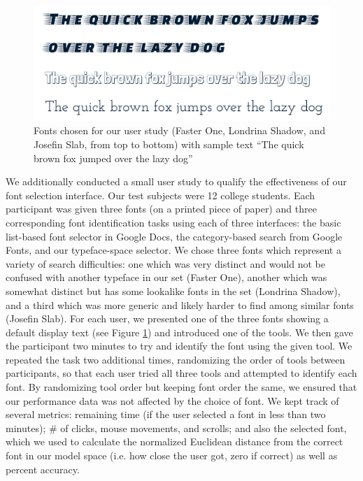 \begin{figure}[h]
    \centering
    \includegraphics[width=\textwidth]{images/user-fonts.pdf}
    \caption{Fonts chosen for our user study (Faster One, Londrina Shadow, and Josefin Slab, from top to bottom) with sample text ``The quick brown fox jumped over the lazy dog''}
    \label{fig:user-fonts}
\end{figure}

We additionally conducted a small user study to qualify the effectiveness of our font selection interface. Our test subjects were 12 college students. Each participant was given three fonts (on a printed piece of paper) and three corresponding font identification tasks using each of three interfaces: the basic list-based font selector in Google Docs, the category-based search from Google Fonts, and our typeface-space selector. We chose three fonts which represent a variety of search difficulties: one which was very distinct and would not be confused with another typeface in our set (Faster One), another which was somewhat distinct but has some lookalike fonts in the set (Londrina Shadow), and a third which was more generic and likely harder to find among similar fonts (Josefin Slab). For each user, we presented one of the three fonts showing a default display text (see Figure \ref{fig:user-fonts}) and introduced one of the tools. We then gave the participant two minutes to try and identify the font using the given tool. We repeated the task two additional times, randomizing the order of tools between participants, so that each user tried all three tools and attempted to identify each font. By randomizing tool order but keeping font order the same, we ensured that our performance data was not affected by the choice of font. We kept track of several metrics: remaining time (if the user selected a font in less than two minutes); \# of clicks, mouse movements, and scrolls; and also the selected font, which we used to calculate the normalized Euclidean distance from the correct font in our model space (i.e. how close the user got, zero if correct) as well as percent accuracy.

